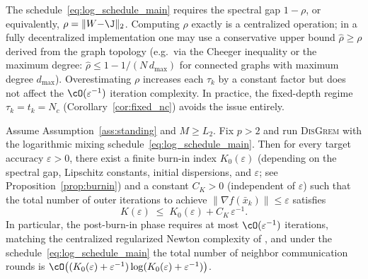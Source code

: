 \documentclass[review,onefignum,onetabnum]{siamart171218}
\begin{document}
	\begin{remark}\label{rem:rho_knowledge}
		The schedule~\eqref{eq:log_schedule_main} requires the spectral
		gap $1{-}\rho$, or equivalently, $\rho=\|W{-}\J\|_2$.
		Computing $\rho$ exactly is a centralized operation; in a fully
		decentralized implementation one may use a conservative upper
		bound $\hat\rho\ge\rho$ derived from the graph topology
		(e.g.\ via the Cheeger inequality or the maximum degree:
		$\hat\rho\le 1-1/(N\,d_{\max})$ for connected graphs with
		maximum degree $d_{\max}$).
		Overestimating $\rho$ increases each $\tau_k$ by a constant
		factor but does not affect the $\cO(\varepsilon^{-1})$ iteration
		complexity.
		In practice, the fixed-depth regime $\tau_k{=}t_k{=}N_c$
		(Corollary~\ref{cor:fixed_nc}) avoids the issue entirely.
	\end{remark}
	
	\begin{theorem}\label{thm:main}
		Assume Assumption~\ref{ass:standing} and $M\ge L_2$.
		Fix $p>2$ and run \textsc{DisGrem} with the logarithmic mixing schedule~\eqref{eq:log_schedule_main}.
		Then for every target accuracy $\varepsilon>0$, there exist a finite burn-in index $K_0(\varepsilon)$
		(depending on the spectral gap, Lipschitz constants, initial dispersions, and $\varepsilon$;
		see Proposition~\ref{prop:burnin})
		and a constant $C_K>0$ (independent of $\varepsilon$) such that the total number of
		outer iterations to achieve $\|\nabla f(\bar x_k)\|\le \varepsilon$ satisfies
		\[
		K(\varepsilon)\;\le\; K_0(\varepsilon) + C_K\,\varepsilon^{-1}.
		\]
		In particular,
		the post-burn-in phase requires at most $\cO(\varepsilon^{-1})$ iterations,
		matching the centralized regularized Newton complexity of \citet{mishchenko2023rn},
		and under the schedule~\eqref{eq:log_schedule_main} the total number of neighbor communication rounds is
		$\cO\big((K_0(\varepsilon)+\varepsilon^{-1})\log(K_0(\varepsilon)+\varepsilon^{-1})\big)$.
	\end{theorem}
	
\end{document}
